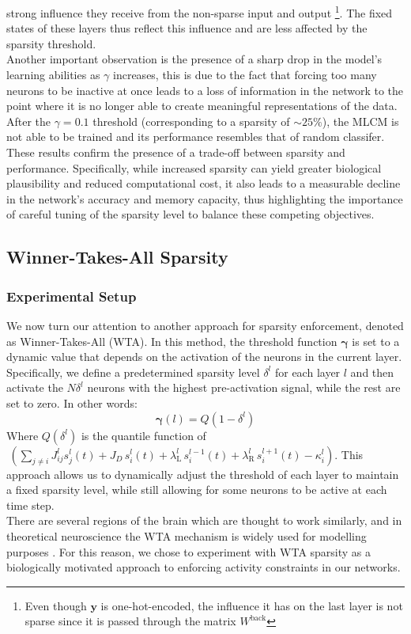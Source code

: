 \documentclass[a4paper,12pt]{report}
\begin{document}
strong influence they receive from the non-sparse input and output
\footnote{Even though $\mathbf{y}$ is one-hot-encoded, 
the influence it has on the last layer is not sparse since it is passed through the 
matrix $W^{\mathrm{back}}$}. The fixed states of these layers thus reflect this 
influence and are less affected by the sparsity threshold. \\
Another important observation is the presence of a sharp drop in the model's learning 
abilities as $\gamma$ increases, this is due to the fact that forcing too many neurons 
to be inactive at once leads to a loss of information in the network to the point 
where it is no longer able to create meaningful representations of the data. After the 
$\gamma = 0.1$ threshold (corresponding to a sparsity of $\sim25\%$), the MLCM is not 
able to be trained and its performance resembles that of random classifer. \\
These results confirm the presence of a trade-off between sparsity and performance. 
Specifically, while increased sparsity can yield greater biological plausibility and 
reduced computational cost, it also leads to a measurable decline in the network's 
accuracy and memory capacity, thus highlighting the importance of careful tuning of the 
sparsity level to balance these competing objectives.
\subsection{Winner-Takes-All Sparsity}
\subsubsection*{Experimental Setup}
We now turn our attention to another approach for sparsity enforcement, denoted as 
Winner-Takes-All (WTA). In this method, the threshold function $\boldsymbol{\gamma}$ 
is set to a dynamic value that depends on the activation of the neurons in the
current layer. Specifically, we define a predetermined sparsity level $\delta^l$ 
for each layer $l$ and then activate the $N\delta^l$ neurons with the highest 
pre-activation signal, while the rest are set to zero. In other words:
$$ \boldsymbol{\gamma}(l) = Q\left(1 - \delta^l\right)$$
Where $Q\left(\delta^l\right)$ is the quantile function of $\hspace{3pt} \left(\displaystyle
\sum_{j \neq i} J_{ij}^l s_j^l(t) + J_D\, s_i^l(t) + \lambda_{\mathrm{L}}^l \, 
s_i^{l-1}(t) + \lambda_{\mathrm{R}}^l\, s_i^{l+1}(t)  - \kappa_i^l\right)$.
This approach allows us to dynamically adjust the threshold of each layer to maintain 
a fixed sparsity level, while still allowing for some neurons to be active at each
time step. \\
There are several regions of the brain which are thought to work similarly, and in 
theoretical neuroscience the WTA mechanism is widely used for modelling purposes
\cite{Marx2015, Carandini2011}. For this reason, we chose to experiment with WTA 
sparsity as a biologically motivated approach to enforcing activity constraints 
in our networks.
\vspace*{0.5em}
\end{document}

